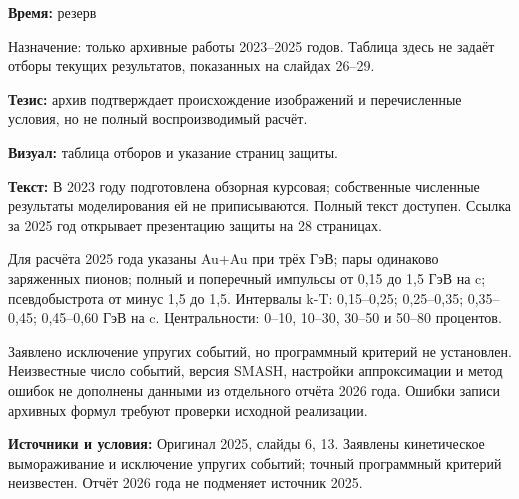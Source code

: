 \textbf{Время:} резерв

Назначение: только архивные работы 2023–2025 годов. Таблица здесь не задаёт отборы текущих результатов, показанных на слайдах 26–29.

\textbf{Тезис:} архив подтверждает происхождение изображений и перечисленные условия, но не полный воспроизводимый расчёт.

\textbf{Визуал:} таблица отборов и указание страниц защиты.

\textbf{Текст:} В 2023 году подготовлена обзорная курсовая; собственные численные результаты моделирования ей не приписываются. Полный текст доступен. Ссылка за 2025 год открывает презентацию защиты на 28 страницах.

Для расчёта 2025 года указаны Au+Au при трёх ГэВ; пары одинаково заряженных пионов; полный и поперечный импульсы от 0,15 до 1,5 ГэВ на c; псевдобыстрота от минус 1,5 до 1,5. Интервалы k-T: 0,15–0,25; 0,25–0,35; 0,35–0,45; 0,45–0,60 ГэВ на c. Центральности: 0–10, 10–30, 30–50 и 50–80 процентов.

Заявлено исключение упругих событий, но программный критерий не установлен. Неизвестные число событий, версия SMASH, настройки аппроксимации и метод ошибок не дополнены данными из отдельного отчёта 2026 года. Ошибки записи архивных формул требуют проверки исходной реализации.

\textbf{Источники и условия:} Оригинал 2025, слайды 6, 13. Заявлены кинетическое вымораживание и исключение упругих событий; точный программный критерий неизвестен. Отчёт 2026 года не подменяет источник 2025.
